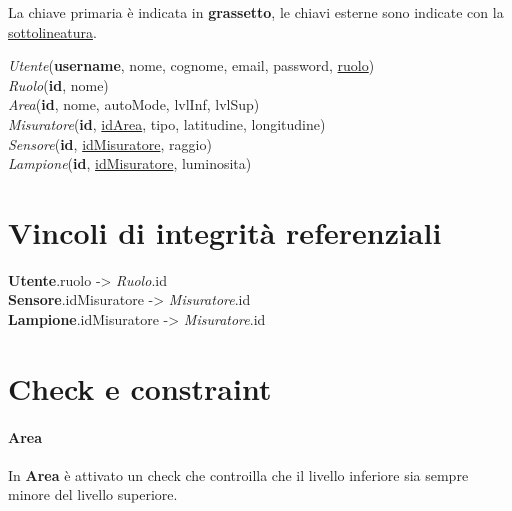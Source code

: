 La chiave primaria è indicata in \textbf{grassetto}, le chiavi esterne sono indicate con la \underline{sottolineatura}.

\textit{Utente}(\textbf{username}, nome, cognome, email, password, \underline{ruolo}) \\
\textit{Ruolo}(\textbf{id}, nome) \\
\textit{Area}(\textbf{id}, nome, autoMode, lvlInf, lvlSup) \\
\textit{Misuratore}(\textbf{id}, \underline{idArea}, tipo, latitudine, longitudine) \\
\textit{Sensore}(\textbf{id}, \underline{idMisuratore}, raggio) \\
\textit{Lampione}(\textbf{id}, \underline{idMisuratore}, luminosita)

\section{Vincoli di integrità referenziali}

\textbf{Utente}.ruolo -> \textit{Ruolo}.id \\
\textbf{Sensore}.idMisuratore -> \textit{Misuratore}.id \\
\textbf{Lampione}.idMisuratore -> \textit{Misuratore}.id

\section{Check e constraint}

\paragraph{Area} In \textbf{Area} è attivato un check che controilla che il livello inferiore sia sempre minore del livello superiore.